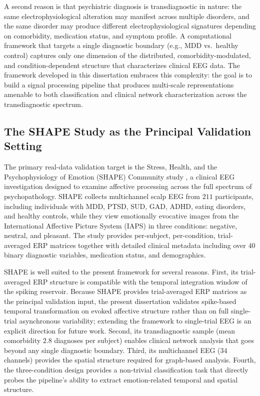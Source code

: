A second reason is that psychiatric diagnosis is transdiagnostic in nature: the same electrophysiological alteration may manifest across multiple disorders, and the same disorder may produce different electrophysiological signatures depending on comorbidity, medication status, and symptom profile. A computational framework that targets a single diagnostic boundary (e.g., MDD vs.\ healthy control) captures only one dimension of the distributed, comorbidity-modulated, and condition-dependent structure that characterizes clinical EEG data. The framework developed in this dissertation embraces this complexity: the goal is to build a signal processing pipeline that produces multi-scale representations amenable to both classification and clinical network characterization across the transdiagnostic spectrum.

\subsection{The SHAPE Study as the Principal Validation Setting}

The primary real-data validation target is the Stress, Health, and the Psychophysiology of Emotion (SHAPE) Community study \cite{noauthor_shape_2018}, a clinical EEG investigation designed to examine affective processing across the full spectrum of psychopathology. SHAPE collects multichannel scalp EEG from $211$ participants, including individuals with MDD, PTSD, SUD, GAD, ADHD, eating disorders, and healthy controls, while they view emotionally evocative images from the International Affective Picture System (IAPS) \cite{lang_iaps_2008} in three conditions: negative, neutral, and pleasant. The study provides per-subject, per-condition, trial-averaged ERP matrices together with detailed clinical metadata including over $40$ binary diagnostic variables, medication status, and demographics.

SHAPE is well suited to the present framework for several reasons. First, its trial-averaged ERP structure is compatible with the temporal integration window of the spiking reservoir. Because SHAPE provides trial-averaged ERP matrices as the principal validation input, the present dissertation validates spike-based temporal transformation on evoked affective structure rather than on full single-trial asynchronous variability; extending the framework to single-trial EEG is an explicit direction for future work. Second, its transdiagnostic sample (mean comorbidity $2.8$ diagnoses per subject) enables clinical network analysis that goes beyond any single diagnostic boundary. Third, its multichannel EEG ($34$ channels) provides the spatial structure required for graph-based analysis. Fourth, the three-condition design provides a non-trivial classification task that directly probes the pipeline's ability to extract emotion-related temporal and spatial structure.

